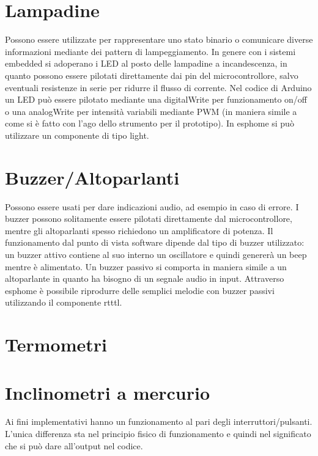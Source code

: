 \documentclass[12pt,a4paper]{report}
\begin{document}
\section{Lampadine}
Possono essere utilizzate per rappresentare uno stato binario o comunicare diverse informazioni mediante dei pattern di lampeggiamento.
In genere con i sistemi embedded si adoperano i LED al posto delle lampadine a incandescenza, in quanto possono essere pilotati
direttamente dai pin del microcontrollore, salvo eventuali resistenze in serie per ridurre il flusso di corrente.
Nel codice di Arduino un LED può essere pilotato mediante una digitalWrite per funzionamento on/off o una analogWrite per
intensità variabili mediante PWM (in maniera simile a come si è fatto con l'ago dello strumento per il prototipo). In esphome si può
utilizzare un componente di tipo light.

\section{Buzzer/Altoparlanti}
Possono essere usati per dare indicazioni audio, ad esempio in caso di errore. I buzzer possono solitamente essere pilotati direttamente
dal microcontrollore, mentre gli altoparlanti spesso richiedono un amplificatore di potenza.
Il funzionamento dal punto di vista software dipende dal tipo di buzzer utilizzato: un buzzer attivo contiene al suo interno un oscillatore
e quindi genererà un beep mentre è alimentato. Un buzzer passivo si comporta in maniera simile a un altoparlante in quanto ha bisogno di
un segnale audio in input. Attraverso esphome è possibile riprodurre delle semplici melodie con buzzer passivi utilizzando il componente rtttl.

\section{Termometri} 

\section{Inclinometri a mercurio}
Ai fini implementativi hanno un funzionamento al pari degli interruttori/pulsanti. L'unica differenza sta nel principio fisico di funzionamento
e quindi nel significato che si può dare all'output nel codice.
\end{document}
